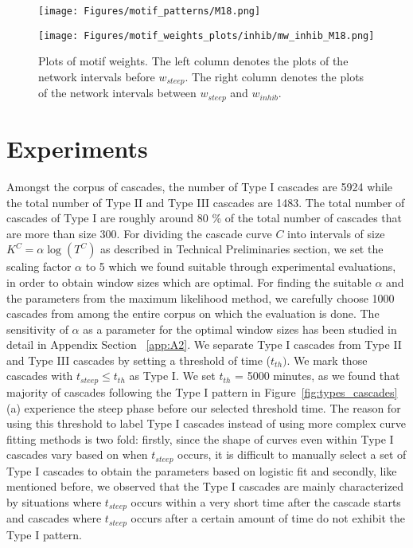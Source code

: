\documentclass[smallextended]{svjour3}       %
\theoremstyle{definition}
\begin{document}
\begin{figure}[]
\begin{minipage}{0.30\textwidth}
	\end{minipage}
	\hfill
	\begin{minipage}{0\textwidth}%
		\texttt{[image: Figures/motif\_patterns/M18.png]}	
	\end{minipage}
	\hfill
	\begin{minipage}{0.35\textwidth}
		\texttt{[image: Figures/motif\_weights\_plots/inhib/mw\_inhib\_M18.png]}
	\end{minipage}
	\hfill
	\caption{Plots of motif weights. The left column denotes the plots of the network intervals before $w_{steep}$. The right column denotes the plots of the network intervals between $w_{steep}$ and $w_{inhib}$. }
	\label{fig:motif_weights}
\end{figure}

\section{Experiments}\label{sec:exp}
Amongst the corpus of cascades, the number of Type I cascades are 5924 while the total number of Type II and Type III cascades are 1483. The total number of cascades of Type I are roughly around 80 \% of the total number of cascades that are more than size 300.
For dividing the cascade curve $C$ into intervals of size $K^C = \alpha \log(T^C)$ as described in Technical Preliminaries section, we set the scaling factor $\alpha $ to 5 which we found suitable through experimental evaluations, in order to obtain window sizes which are optimal. For finding the suitable $\alpha$ and the parameters from the maximum likelihood method, we carefully choose 1000 cascades from among the entire corpus on which the evaluation is done. The sensitivity of $\alpha$ as a parameter for the optimal window sizes has been studied in detail in Appendix Section ~\ref{app:A2}. We separate Type I cascades from Type II and Type III cascades by setting a threshold of time ($t_{th})$. We mark those cascades with $t_{steep} \le t_{th}$ as Type I. We set $t_{th} $ = 5000 minutes, as we found that majority of cascades following the Type I pattern in Figure~\ref{fig:types_cascades}(a) experience the steep phase before our selected threshold time. The reason for using this threshold to label Type I cascades instead of using more complex curve fitting methods is two fold: firstly, since the shape of curves even within Type I cascades vary based on when $t_{steep} $ occurs, it is difficult to manually select a set of Type I cascades to obtain the parameters based on logistic fit and secondly, like mentioned before, we observed that the Type I cascades are mainly characterized by situations where $t_{steep} $ occurs within a very short time after the cascade starts and cascades where $t_{steep}$ occurs after a certain amount of time do not exhibit the Type I pattern.
\end{document}
